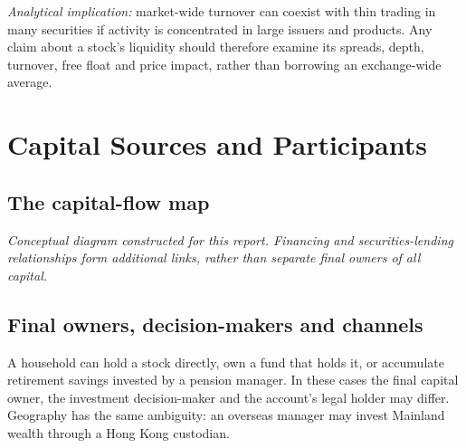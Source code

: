 \documentclass[11pt,a4paper]{article}
\begin{document}
\textit{Analytical implication:} market-wide turnover can coexist with thin trading in many securities if activity is concentrated in large issuers and products. Any claim about a stock's liquidity should therefore examine its spreads, depth, turnover, free float and price impact, rather than borrowing an exchange-wide average.

\section{Capital Sources and Participants}
\subsection{The capital-flow map}
\begin{center}
\end{center}
\textit{Conceptual diagram constructed for this report. Financing and securities-lending relationships form additional links, rather than separate final owners of all capital.}

\subsection{Final owners, decision-makers and channels}
A household can hold a stock directly, own a fund that holds it, or accumulate retirement savings invested by a pension manager. In these cases the final capital owner, the investment decision-maker and the account's legal holder may differ. Geography has the same ambiguity: an overseas manager may invest Mainland wealth through a Hong Kong custodian.
\end{document}
